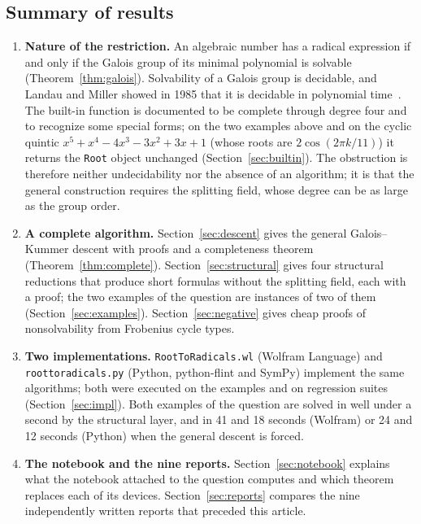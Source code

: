 \documentclass[11pt,a4paper]{article}
\theoremstyle{definition}
\theoremstyle{remark}
\newcommand{\code}[1]{\texttt{#1}}
\newcommand{\Root}{\code{Root}}
\begin{document}
\subsection{Summary of results}

\begin{enumerate}[nosep]\sloppy
\item \textbf{Nature of the restriction.}  An algebraic number has a radical expression
if and only if the Galois group of its minimal polynomial is solvable
(Theorem~\ref{thm:galois}).  Solvability of a Galois group is decidable, and Landau and
Miller showed in 1985 that it is decidable in polynomial time~\cite{LandauMiller}.  The
built-in function is documented to be complete through degree four and to recognize
some special forms; on the two examples above and on the cyclic quintic
$x^5+x^4-4x^3-3x^2+3x+1$ (whose roots are $2\cos(2\pi k/11)$) it returns the \Root{}
object unchanged (Section~\ref{sec:builtin}).  The obstruction is therefore neither
undecidability nor the absence of an algorithm; it is that the general construction
requires the splitting field, whose degree can be as large as the group order.
\item \textbf{A complete algorithm.}  Section~\ref{sec:descent} gives the general
Galois--Kummer descent with proofs and a completeness theorem
(Theorem~\ref{thm:complete}).  Section~\ref{sec:structural} gives four structural
reductions that produce short formulas without the splitting field, each with a proof;
the two examples of the question are instances of two of them
(Section~\ref{sec:examples}).  Section~\ref{sec:negative} gives cheap proofs of
nonsolvability from Frobenius cycle types.
\item \textbf{Two implementations.}  \code{RootToRadicals.wl} (Wolfram Language) and
\code{roottoradicals.py} (Python, python-flint and SymPy) implement the same
algorithms; both were executed on the examples and on regression suites
(Section~\ref{sec:impl}).  Both examples of the question are solved in well under a
second by the structural layer, and in 41 and 18 seconds (Wolfram) or 24 and 12 seconds
(Python) when the general descent is forced.
\item \textbf{The notebook and the nine reports.}  Section~\ref{sec:notebook} explains
what the notebook attached to the question computes and which theorem replaces each of
its devices.  Section~\ref{sec:reports} compares the nine independently written reports
that preceded this article.
\end{enumerate}
\end{document}
